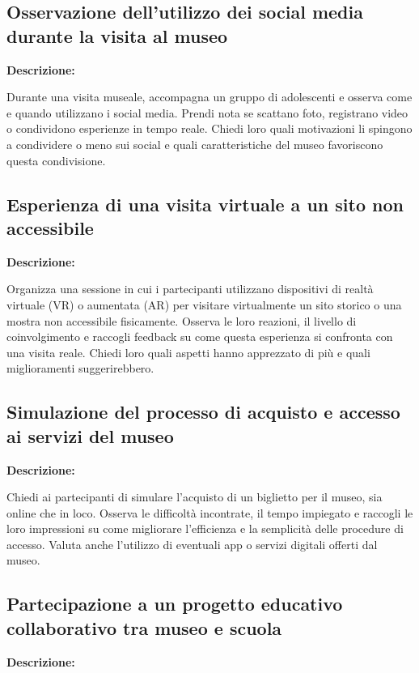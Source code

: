 \documentclass{article}
\begin{document}
\subsection{Osservazione dell’utilizzo dei social media durante la visita al museo}

\textbf{Descrizione:}

Durante una visita museale, accompagna un gruppo di adolescenti e osserva come e quando utilizzano i social media. Prendi nota se scattano foto, registrano video o condividono esperienze in tempo reale. Chiedi loro quali motivazioni li spingono a condividere o meno sui social e quali caratteristiche del museo favoriscono questa condivisione.

\subsection{Esperienza di una visita virtuale a un sito non accessibile}

\textbf{Descrizione:}

Organizza una sessione in cui i partecipanti utilizzano dispositivi di realtà virtuale (VR) o aumentata (AR) per visitare virtualmente un sito storico o una mostra non accessibile fisicamente. Osserva le loro reazioni, il livello di coinvolgimento e raccogli feedback su come questa esperienza si confronta con una visita reale. Chiedi loro quali aspetti hanno apprezzato di più e quali miglioramenti suggerirebbero.

\subsection{Simulazione del processo di acquisto e accesso ai servizi del museo}

\textbf{Descrizione:}

Chiedi ai partecipanti di simulare l’acquisto di un biglietto per il museo, sia online che in loco. Osserva le difficoltà incontrate, il tempo impiegato e raccogli le loro impressioni su come migliorare l’efficienza e la semplicità delle procedure di accesso. Valuta anche l’utilizzo di eventuali app o servizi digitali offerti dal museo.

\subsection{Partecipazione a un progetto educativo collaborativo tra museo e scuola}

\textbf{Descrizione:}
\end{document}
